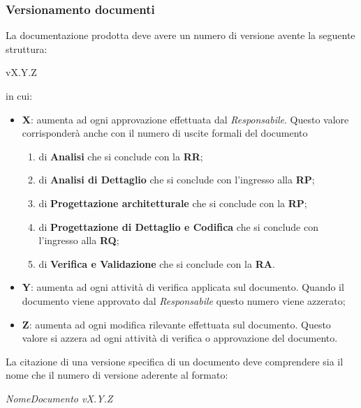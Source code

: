 \documentclass{scalatekids-article}
\begin{document}
\subsubsection{Versionamento documenti}
La documentazione prodotta deve avere un numero di versione avente la seguente struttura:\\
\begin{center}
  vX.Y.Z
\end{center}
in cui:
\begin{itemize}
\item \textbf{X}: aumenta  ad ogni approvazione effettuata dal \textit{Responsabile}. Questo valore corrisponderà anche con il numero di uscite formali del documento
  \begin{enumerate}
  \item{} di \textbf{Analisi} che si conclude con la \textbf{RR};
  \item{} di \textbf{Analisi di Dettaglio} che si conclude con l'ingresso alla \textbf{RP};
  \item{} di \textbf{Progettazione architetturale} che si conclude con la \textbf{RP};
  \item{} di \textbf{Progettazione di Dettaglio e Codifica} che si conclude con l'ingresso alla \textbf{RQ};
  \item{} di \textbf{Verifica e Validazione} che si conclude con la \textbf{RA}.
  \end{enumerate}
\item \textbf{Y}: aumenta ad ogni attività di verifica applicata sul documento. Quando il documento viene approvato dal \textit{Responsabile} questo numero viene azzerato;
\item \textbf{Z}: aumenta ad ogni modifica rilevante effettuata sul documento. Questo valore si azzera ad ogni attività di verifica o approvazione del documento.
\end{itemize}
La citazione di una versione specifica di un documento deve comprendere sia il nome che il numero di versione aderente al formato:
\begin{center}
  \textit{NomeDocumento vX.Y.Z}
\end{center}
\end{document}
